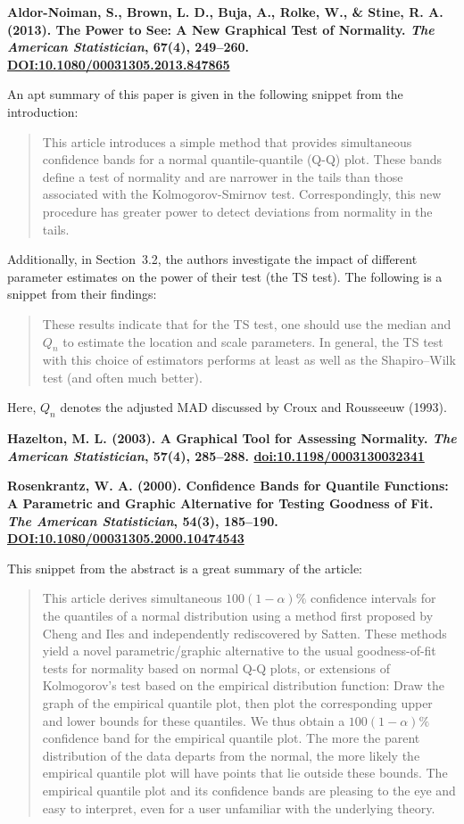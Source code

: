 \documentclass{article}
\begin{document}
\textbf{Aldor-Noiman, S., Brown, L. D., Buja, A., Rolke, W., \& Stine, R. A. (2013). The Power to See: A New Graphical Test of Normality. \emph{The American Statistician}, 67(4), 249--260. \url{DOI:10.1080/00031305.2013.847865}}

An apt summary of this paper is given in the following snippet from the introduction:
\begin{quote}
This article introduces a simple method that provides simultaneous confidence bands for a normal quantile-quantile (Q-Q) plot. These bands define a test of normality and are narrower in the tails than those associated with the Kolmogorov-Smirnov test. Correspondingly, this new procedure has greater power to detect deviations from normality in the tails.
\end{quote}

Additionally, in Section~3.2, the authors investigate the impact of different parameter estimates on the power of their test (the TS test). The following is a snippet from their findings:

\begin{quote}
These results indicate that for the TS test, one should use the median and $Q_n$ to estimate the location and scale parameters. In general, the TS test with this choice of estimators performs at least as well as the Shapiro--Wilk test (and often much better).
\end{quote}

Here, $Q_n$ denotes the adjusted MAD discussed by Croux and Rousseeuw (1993).

\bigskip


{\bf Hazelton, M. L. (2003). A Graphical Tool for Assessing Normality. \emph{The American Statistician}, 57(4), 285--288. \url{doi:10.1198/0003130032341}}

{\bf Rosenkrantz, W. A. (2000). Confidence Bands for Quantile Functions: A Parametric and Graphic Alternative for Testing Goodness of Fit. \emph{The American Statistician}, 54(3), 185--190. \url{DOI:10.1080/00031305.2000.10474543}}

This snippet from the abstract is a great summary of the article:

\begin{quote}
This article derives simultaneous $100( 1 - \alpha )\%$ confidence intervals for the quantiles of a normal distribution using a method first proposed by Cheng and Iles and independently rediscovered by Satten. These methods yield a novel parametric/graphic alternative to the usual goodness-of-fit tests for normality based on normal Q-Q plots, or extensions of Kolmogorov's test based on the empirical distribution function: Draw the graph of the empirical quantile plot, then plot the corresponding upper and lower bounds for these quantiles. We thus obtain a $100( 1 - \alpha )\%$ confidence band for the empirical quantile plot. The more the parent distribution of the data departs from the normal, the more likely the empirical quantile plot will have points that lie outside these bounds. The empirical quantile plot and its confidence bands are pleasing to the eye and easy to interpret, even for a user unfamiliar with the underlying theory.
\end{quote}
\end{document}
